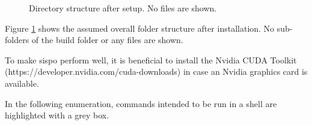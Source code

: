 \begin{figure}
    \caption{Directory structure after setup. No files are shown.}
    \label{fig:dir_tree}
\end{figure}
Figure \ref{fig:dir_tree} shows the assumed overall folder structure after installation. No sub-folders of the build folder or any files are shown.

To make \gls{sispo} perform well, it is beneficial to install the Nvidia CUDA Toolkit (https://developer.nvidia.com/cuda-downloads) in case an Nvidia graphics card is available.

In the following enumeration, commands intended to be run in a shell are highlighted with a grey box.

